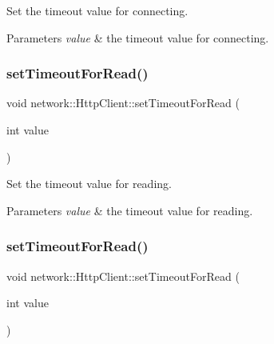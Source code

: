 Set the timeout value for connecting.


\begin{DoxyParams}{Parameters}
{\em value} & the timeout value for connecting. \\
\hline
\end{DoxyParams}
\mbox{\label{classnetwork_1_1HttpClient_a30fa6578fdbe46651312fd7ead04981e}} 
\subsubsection{\texorpdfstring{set\+Timeout\+For\+Read()}{setTimeoutForRead()}\hspace{0.1cm}{\footnotesize\ttfamily [1/2]}}
{\footnotesize\ttfamily void network\+::\+Http\+Client\+::set\+Timeout\+For\+Read (\begin{DoxyParamCaption}\item[{int}]{value }\end{DoxyParamCaption})}

Set the timeout value for reading.


\begin{DoxyParams}{Parameters}
{\em value} & the timeout value for reading. \\
\hline
\end{DoxyParams}
\mbox{\label{classnetwork_1_1HttpClient_a30fa6578fdbe46651312fd7ead04981e}} 
\subsubsection{\texorpdfstring{set\+Timeout\+For\+Read()}{setTimeoutForRead()}\hspace{0.1cm}{\footnotesize\ttfamily [2/2]}}
{\footnotesize\ttfamily void network\+::\+Http\+Client\+::set\+Timeout\+For\+Read (\begin{DoxyParamCaption}\item[{int}]{value }\end{DoxyParamCaption})}

